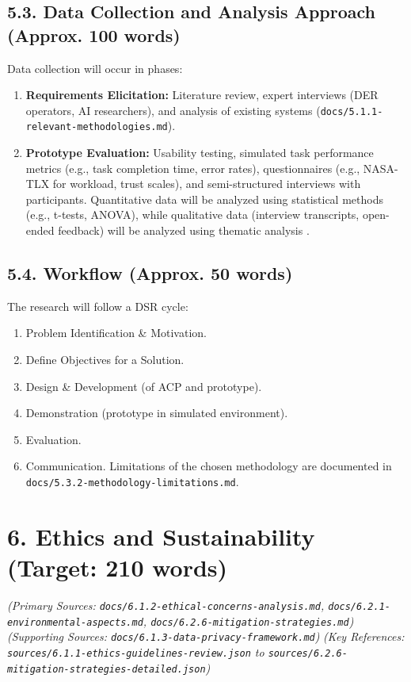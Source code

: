 \documentclass[12pt,a4paper]{article}
\begin{document}
\begin{itemize}
\begin{itemize}
\begin{itemize}
\begin{itemize}
\begin{itemize}
\begin{itemize}
\subsection{5.3. Data Collection and Analysis Approach (Approx. 100 words)}
Data collection will occur in phases:

\begin{enumerate}
\item  \textbf{Requirements Elicitation:} Literature review, expert interviews (DER operators, AI researchers), and analysis of existing systems (\texttt{docs/5.1.1-relevant-methodologies.md}).
\item  \textbf{Prototype Evaluation:} Usability testing, simulated task performance metrics (e.g., task completion time, error rates), questionnaires (e.g., NASA-TLX for workload, trust scales), and semi-structured interviews with participants.
Quantitative data will be analyzed using statistical methods (e.g., t-tests, ANOVA), while qualitative data (interview transcripts, open-ended feedback) will be analyzed using thematic analysis \cite{CitationNeeded_ThematicAnalysisBraunClarke}.
\end{enumerate}

\subsection{5.4. Workflow (Approx. 50 words)}
The research will follow a DSR cycle:

\begin{enumerate}
\item  Problem Identification & Motivation.
\item  Define Objectives for a Solution.
\item  Design & Development (of ACP and prototype).
\item  Demonstration (prototype in simulated environment).
\item  Evaluation.
\item  Communication.
Limitations of the chosen methodology are documented in \texttt{docs/5.3.2-methodology-limitations.md}.
\end{enumerate}

\section{6. Ethics and Sustainability (Target: 210 words)}

\emph{(Primary Sources: \texttt{docs/6.1.2-ethical-concerns-analysis.md}, \texttt{docs/6.2.1-environmental-aspects.md}, \texttt{docs/6.2.6-mitigation-strategies.md})}
\emph{(Supporting Sources: \texttt{docs/6.1.3-data-privacy-framework.md})}
\emph{(Key References: \texttt{sources/6.1.1-ethics-guidelines-review.json} to \texttt{sources/6.2.6-mitigation-strategies-detailed.json})}


\end{itemize}
\end{itemize}
\end{itemize}
\end{itemize}
\end{itemize}
\end{itemize}
\end{document}

